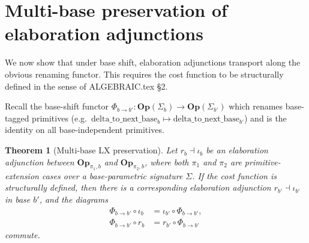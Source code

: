\documentclass[11pt]{article}
\newtheorem{theorem}{Theorem}
\begin{document}
\section{Multi-base preservation of elaboration adjunctions}\label{sec:multi-base}

We now show that under base shift, elaboration adjunctions transport along
the obvious renaming functor. This requires the cost function to be
structurally defined in the sense of ALGEBRAIC.tex \S2.

Recall the base-shift functor $\Phi_{b \to b'} :
\mathbf{Op}(\Sigma_b) \to \mathbf{Op}(\Sigma_{b'})$ which renames
base-tagged primitives (e.g.\ $\mathrm{delta\_to\_next\_base}_b
\mapsto \mathrm{delta\_to\_next\_base}_{b'}$) and is the identity on
all base-independent primitives.

\begin{theorem}[Multi-base LX preservation]\label{thm:multi-base-lx}
Let $r_b \dashv \iota_b$ be an elaboration adjunction between
$\mathbf{Op}_{\pi_1, b}$ and $\mathbf{Op}_{\pi_2, b}$, where both
$\pi_1$ and $\pi_2$ are primitive-extension cases over a
base-parametric signature $\Sigma$. If the cost function is
structurally defined, then there is a corresponding elaboration adjunction
$r_{b'} \dashv \iota_{b'}$ in base $b'$, and the diagrams
\begin{align}
\Phi_{b \to b'} \circ \iota_b &= \iota_{b'} \circ \Phi_{b \to b'}, \\
\Phi_{b \to b'} \circ r_b &= r_{b'} \circ \Phi_{b \to b'}
\end{align}
commute.
\end{theorem}
\end{document}
